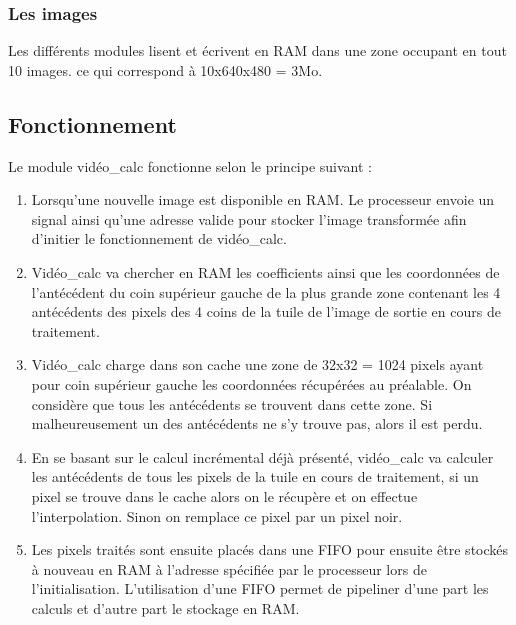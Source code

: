 \documentclass[a4paper,12pt]{report}
\begin{document}
{{	\subsubsection*{Les images}

Les différents modules lisent et écrivent en RAM dans une zone occupant en tout 10 images. ce qui correspond à 10x640x480 = 3Mo.

	\subsection{Fonctionnement}

Le module vidéo\_calc fonctionne selon le principe suivant :

\begin{enumerate}

\item  Lorsqu'une nouvelle image est disponible en RAM. Le processeur envoie un signal ainsi qu'une adresse valide pour stocker l'image transformée afin d'initier le fonctionnement de vidéo\_calc.

\item Vidéo\_calc va chercher en RAM les coefficients ainsi que les coordonnées de l'antécédent du coin supérieur gauche de la plus grande zone contenant les 4 antécédents des pixels des 4 coins de la tuile de l'image de sortie en cours de traitement.

\item Vidéo\_calc charge dans son cache une zone de 32x32 = 1024 pixels ayant pour coin supérieur gauche les coordonnées récupérées au préalable. On considère que tous les antécédents se trouvent dans cette zone. Si malheureusement un des antécédents ne s'y trouve pas, alors il est perdu.

\item En se basant sur le calcul incrémental déjà présenté, vidéo\_calc va calculer les antécédents de tous les pixels de la tuile en cours de traitement, si un pixel se trouve dans le cache alors on le récupère et  on effectue l'interpolation. Sinon on remplace ce pixel par un pixel noir.

\item Les pixels traités sont ensuite placés dans une FIFO pour ensuite être stockés à nouveau en RAM à l'adresse spécifiée par le processeur lors de l'initialisation. L'utilisation d'une FIFO permet de pipeliner d'une part les calculs et d'autre part le stockage en RAM.

\end{enumerate}

}}
\end{document}
